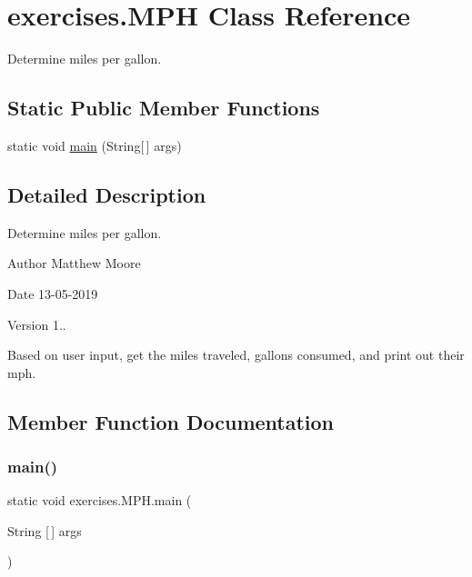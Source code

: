 \hypertarget{classexercises_1_1_m_p_h}{}\section{exercises.\+M\+PH Class Reference}
\label{classexercises_1_1_m_p_h}


Determine miles per gallon.  


\subsection*{Static Public Member Functions}
\begin{DoxyCompactItemize}
\item 
static void \mbox{\hyperlink{classexercises_1_1_m_p_h_a01cbcacb906af8e66c0230063659f3e4}{main}} (String\mbox{[}$\,$\mbox{]} args)
\end{DoxyCompactItemize}


\subsection{Detailed Description}
Determine miles per gallon. 

\begin{DoxyAuthor}{Author}
Matthew Moore 
\end{DoxyAuthor}
\begin{DoxyDate}{Date}
13-\/05-\/2019 
\end{DoxyDate}
\begin{DoxyVersion}{Version}
1..
\end{DoxyVersion}
Based on user input, get the miles traveled, gallons consumed, and print out their mph. 

\subsection{Member Function Documentation}
\mbox{\label{classexercises_1_1_m_p_h_a01cbcacb906af8e66c0230063659f3e4}} 
\subsubsection{\texorpdfstring{main()}{main()}}
{\footnotesize\ttfamily static void exercises.\+M\+P\+H.\+main (\begin{DoxyParamCaption}\item[{String \mbox{[}$\,$\mbox{]}}]{args }\end{DoxyParamCaption})\hspace{0.3cm}{\ttfamily [static]}}

